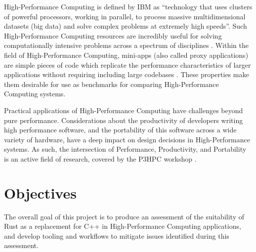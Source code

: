 High-Performance Computing is defined by IBM as ``technology that uses clusters of powerful processors, working in parallel, to process massive multidimensional datasets (big data) and solve complex problems at extremely high speeds''\cite{WhatHPCIntroduction}. Such High-Performance Computing resources are incredibly useful for solving computationally intensive problems across a spectrum of disciplines \cite{JournalDescriptionInternational}.
Within the field of High-Performance Computing, mini-apps (also called proxy applications) are simple pieces of code which replicate the performance characteristics of larger applications without requiring including large codebases \cite{heroux2013mantevo}. These properties make them desirable for use as benchmarks for comparing High-Performance Computing systems.

Practical applications of High-Performance Computing have challenges beyond pure performance. Considerations about the productivity of developers writing high performance software, and the portability of this software across a wide variety of hardware, have a deep impact on design decisions in High-Performance systems. As such, the intersection of Performance, Productivity, and Portability is an active field of research, covered by the P3HPC workshop \cite{P3HPC}.



\section{Objectives}
\label{sec:objectives}

The overall goal of this project is to produce an assessment of the suitability of Rust as a replacement for C++ in High-Performance Computing applications, and develop tooling and workflows to mitigate issues identified during this assessment.

